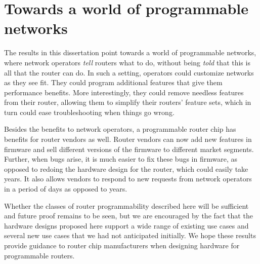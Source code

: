 \section{Towards a world of programmable networks}

The results in this dissertation point towards a world of programmable
networks, where network operators \textit{tell} routers what to do, without
being \textit{told} that this is all that the router can do. In such a setting,
operators could customize networks as they see fit.  They could program
additional features that give them performance benefits.  More interestingly,
they could remove needless features from their router, allowing them to
simplify their routers' feature sets, which in turn could ease troubleshooting
when things go wrong.

Besides the benefits to network operators, a programmable router chip has
benefits for router vendors as well. Router vendors can now add new features in
firmware and sell different versions of the firmware to different market
segments. Further, when bugs arise, it is much easier to fix these bugs in
firmware, as opposed to redoing the hardware design for the router, which could
easily take years. It also allows vendors to respond to new requests from
network operators in a period of days as opposed to years.

Whether the classes of router programmability described here will be sufficient
and future proof remains to be seen, but we are encouraged by the fact that the
hardware designs proposed here support a wide range of existing use cases and
several new use cases that we had not anticipated initially. We hope these
results provide guidance to router chip manufacturers when designing hardware
for programmable routers.
